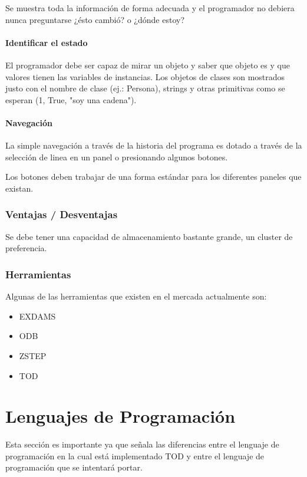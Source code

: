 \documentclass[12pt,legalpaper]{report}
\begin{document}
Se muestra toda la información de forma adecuada y el programador no debiera nunca preguntarse ¿ésto cambió? o ¿dónde estoy?

				\paragraph{Identificar el estado}

El programador debe ser capaz de mirar un objeto y saber que objeto es y que valores tienen las variables de instancias.  Los objetos de clases son mostrados justo con el nombre de clase (ej.: Persona), strings y otras primitivas como se esperan (1, True, "soy una cadena").

				\paragraph{Navegación}

La simple navegación a través de la historia del programa es dotado a través de la selección de linea en un panel o presionando algunos botones.

Los botones deben trabajar de una forma estándar para los diferentes paneles que existan.


			\subsubsection{Ventajas / Desventajas}

Se debe tener una capacidad de almacenamiento bastante grande, un cluster de preferencia.

			\subsubsection{Herramientas}

Algunas de las herramientas que existen en el mercada actualmente son:
\begin{itemize}
	\item EXDAMS
	\item ODB
	\item ZSTEP
	\item TOD
\end{itemize}

	\section{Lenguajes de Programación}

Esta sección es importante ya que señala las diferencias entre el lenguaje de programación en la cual está implementado TOD y entre el lenguaje de programación que se intentará portar.
\end{document}
